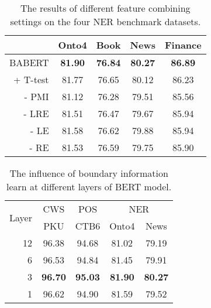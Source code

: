\documentclass[11pt]{article}
\begin{document}
\begin{CJK}{UTF8}{gbsn}
\begin{table}[t]
  \centering
  \begin{tabular}{@{}r|cccc@{}}
  \toprule
  \multicolumn{1}{l|}{}       & Onto4       & Book        & News        & Finance \\ \midrule
  \multicolumn{1}{l|}{BABERT} & \bf{81.90}  & \bf{76.84}  & \bf{80.27}  & \bf{86.89}   \\ \midrule
  + T-test                    & 81.77       & 76.65       & 80.12       & 86.23   \\
  - PMI                       & 81.12       & 76.28       & 79.51       & 85.56   \\
  - LRE                       & 81.51       & 76.47       & 79.67       & 85.94  \\ \bottomrule
  - LE                       & 81.58       & 76.62       & 79.88       & 85.94  \\ 
  - RE                       & 81.53       & 76.59       & 79.75       & 85.90  \\ \bottomrule
  \end{tabular}
  \caption{The results of different feature combining settings on the four NER benchmark datasets.}
  \label{tab:ana-feature}
\end{table}

\begin{table}[t]
  \centering
  \begin{tabular}{@{}r|c|c|cc@{}}
  \toprule
  \multirow{2}{*}{Layer}   & CWS        & POS        & \multicolumn{2}{c}{NER} \\
                           & PKU        & CTB6       & Onto4      & News       \\ \midrule
  12                       & 96.38      & 94.68      & 81.02      & 79.19     \\
  6                        & 96.53      & 94.84      & 81.45      & 79.91      \\
  3                        &\bf{96.70}  & \bf{95.03} & \bf{81.90} & \bf{80.27}      \\
  1                        & 96.62      & 94.90      & 81.59      & 79.52      \\ \bottomrule
  \end{tabular}
  \caption{The influence of boundary information learn at different layers of BERT model.}
  \label{tab:layer}
\end{table}


\end{CJK}
\end{document}
